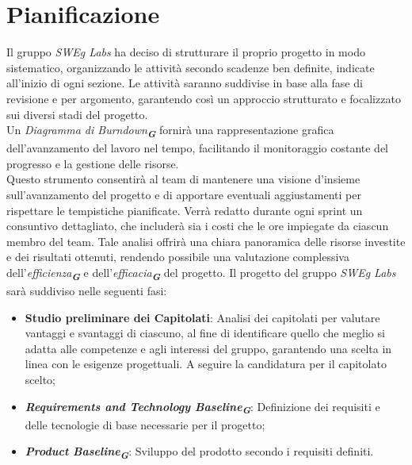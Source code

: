 
\section{Pianificazione}
\label{sec:pianificazione}
Il gruppo \emph{SWEg Labs} ha deciso di strutturare il proprio progetto in modo sistematico, 
organizzando le attività secondo scadenze ben definite, indicate all'inizio di ogni sezione. Le attività saranno suddivise in base alla fase di revisione e per argomento, garantendo così un approccio strutturato e focalizzato sui diversi stadi del progetto.\\
Un \emph{Diagramma di Burndown}\textsubscript{\textit{\textbf{G}}} fornirà una rappresentazione grafica dell'avanzamento del lavoro nel tempo, facilitando il monitoraggio costante del progresso e la gestione delle risorse.\\
Questo strumento consentirà al team di mantenere una visione d'insieme sull’avanzamento del progetto e di apportare eventuali aggiustamenti per rispettare le tempistiche pianificate.
Verrà redatto durante ogni sprint un consuntivo dettagliato, che includerà sia i costi che le ore impiegate da ciascun membro del team. Tale analisi offrirà una chiara panoramica delle risorse investite e dei risultati ottenuti, rendendo possibile una valutazione complessiva 
dell’\emph{efficienza}\textsubscript{\textit{\textbf{G}}} e dell’\emph{efficacia}\textsubscript{\textit{\textbf{G}}} del progetto.
Il progetto del gruppo \emph{SWEg Labs} sarà suddiviso nelle seguenti fasi:
\begin{itemize}
    \item \textbf{Studio preliminare dei Capitolati}: Analisi dei capitolati per valutare vantaggi e svantaggi di ciascuno, al fine di identificare quello che meglio si adatta alle competenze e agli interessi del gruppo, garantendo una scelta in linea con le esigenze progettuali. A seguire la candidatura per il capitolato scelto;
    \item \textbf{\emph{Requirements and Technology Baseline}}\textsubscript{\textit{\textbf{G}}}: Definizione dei requisiti e delle tecnologie di base necessarie per il progetto;
    \item \textbf{\emph{Product Baseline}}\textsubscript{\textit{\textbf{G}}}: Sviluppo del prodotto secondo i requisiti definiti.
\end{itemize}

